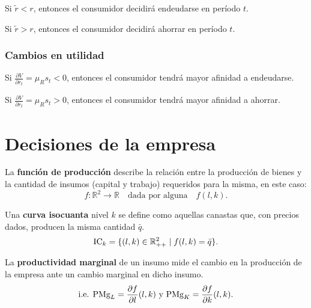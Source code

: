\documentclass[8pt,a4paper]{extarticle}
\begin{document}
\begin{multicols}{3}
\begin{eqlist}
\item Si $ \tilde{r} < r $, entonces el consumidor decidirá endeudarse en período $t$.
\item Si $ \tilde{r} > r $, entonces el consumidor decidirá ahorrar en período $t$.
\end{eqlist}

\subsubsection*{Cambios en utilidad}

\begin{eqlist}
\item Si $\displaystyle \frac{\partial V}{\partial r_t} = \mu_R s_t < 0$, entonces el consumidor tendrá mayor afinidad a endeudarse.
\item Si $\displaystyle \frac{\partial V}{\partial r_t} = \mu_R s_t > 0$, entonces el consumidor tendrá mayor afinidad a ahorrar.
\end{eqlist}

\newpage

\section{Decisiones de la empresa}

\begin{boxdef}
	La \textbf{función de producción} describe la relación entre la producción de bienes y la cantidad de insumos (capital y trabajo) requeridos para la misma, en este caso:
	\[
		f: \mathbb{R}^2 \to \mathbb{R} \quad \text{dada por alguna} \quad f(l, k)
	.\] 
\end{boxdef}

\begin{boxdef}[Isocuanta]
Una \textbf{curva isocuanta} nivel $k$ se define como aquellas canastas que, con precios dados, producen la misma cantidad $\bar{q}$. \\
$$\text{\normalfont IC}_k = \{(l, k) \in \mathbb{R}^2_{++} \mid f(l, k) = \bar{q} \}.$$
\end{boxdef}

\begin{boxdef}
	La \textbf{productividad marginal} de un insumo mide el cambio en la producción de la empresa ante un cambio marginal en dicho insumo.
	\[
		\text{\normalfont i.e. PMg}_L = \frac{\partial f}{\partial l} (l, k)\ \text{\normalfont y PMg}_K = \frac{\partial f}{\partial k} (l, k)
	.\] 
\end{boxdef}


\end{multicols}
\end{document}
